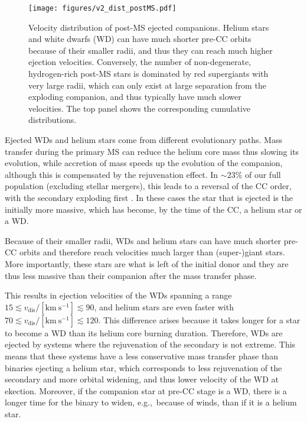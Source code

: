 \documentclass{aa}
\begin{document}
\begin{figure}[tp]
  \centering
  \texttt{[image: figures/v2\_dist\_postMS.pdf]}
  \caption{Velocity distribution of post-MS ejected companions. Helium
    stars and white dwarfs (WD) can have much shorter pre-CC orbits
    because of their smaller radii, and thus they can reach much
    higher ejection velocities. Conversely, the number of non-degenerate, hydrogen-rich
    post-MS stars is dominated by red supergiants with very large
    radii, which can only exist at large separation from the exploding
    companion, and thus typically have much slower velocities. The top
    panel shows the corresponding cumulative distributions.}
  \label{fig:v2_postMS}
\end{figure}




Ejected WDs and helium stars come from different evolutionary paths. Mass transfer during the primary MS
can reduce the helium core mass thus slowing its evolution, while
accretion of mass speeds up the evolution of the companion, although this is compensated by the rejuvenation effect. In
$\sim23\%$ of our full population (excluding stellar mergers), this leads
to a reversal of the CC order, with the secondary exploding first \citep[][]{pols:94}. In
these cases the star that is ejected is the initially more massive, which
has become, by the time of the CC, a helium star or a WD.

Because of their smaller radii, WDs and helium stars can
have much shorter pre-CC orbits and therefore reach velocities much
larger than (super-)giant stars. More importantly, these stars are what
is left of the initial donor and they are thus less massive than
their companion after the mass transfer phase.

This results in ejection velocities of
the WDs spanning a range  $15 \lesssim v_\mathrm{dis}/\mathrm{[km\
  s^{-1}]}\lesssim 90$, and helium stars are even faster with $70 \lesssim v_\mathrm{dis}/\mathrm{[km\ s^{-1}]}\lesssim
120$. This difference arises because it takes longer for a star to
become a WD than its helium core burning duration. Therefore, WDs are
ejected by systems where the rejuvenation of the 
secondary is not extreme. This means that these systems have
a less conservative mass transfer phase than binaries ejecting a
helium star, which corresponds to less
rejuvenation of the secondary and more orbital widening, and thus
lower velocity of the WD at ekection. Moreover, if
the companion star at pre-CC stage is a WD,  there is a longer time
for the binary to widen, e.g.,~because of winds, than if it is a
helium star.
\end{document}
